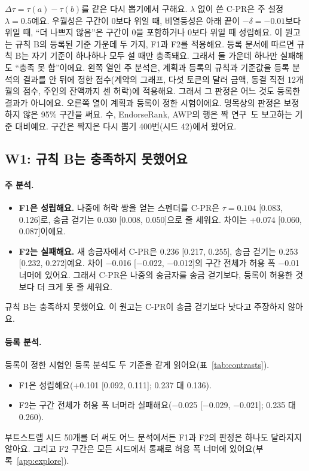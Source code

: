 \begin{table}[!p]
\vspace{4pt}
\parbox{\linewidth}{\footnotesize $\Delta\tau=\tau(a)-\tau(b)$를 같은 다시 뽑기에서 구해요. $\lambda$ 없이 쓴 C-PR은 주 설정 $\lambda=0.5$예요. 우월성은 구간이 0보다 위일 때, 비열등성은 아래 끝이 $-\delta=-0.01$보다 위일 때, “더 나쁘지 않음”은 구간이 0을 포함하거나 0보다 위일 때 성립해요. 이 원고는 규칙 B의 등록된 기준 가운데 두 가지, F1과 F2를 적용해요. 등록 문서에 따르면 규칙 B는 자기 기준이 하나하나 모두 설 때만 충족돼요. 그래서 둘 가운데 하나만 실패해도 “충족 못 함”이에요. 왼쪽 열인 주 분석은, 계획과 등록의 규칙과 기준값을 등록 분석의 결과를 안 뒤에 정한 점수(계약의 그래프, 다섯 토큰의 달러 금액, 동결 직전 12개월의 점수, 주인의 잔액까지 센 허락)에 적용해요. 그래서 그 판정은 어느 것도 등록한 결과가 아니에요. 오른쪽 열이 계획과 등록이 정한 시험이에요. 명목상의 판정은 보정하지 않은 95\% 구간을 써요. 수, EndorseRank, AWP의 행은 짝 연구~\cite{kwon2026companion}도 보고하는 기준 대비예요. 구간은 짝지은 다시 뽑기 400번(시드 42)에서 왔어요.}
\end{table}

\subsection{W1: 규칙 B는 충족하지 못했어요}

\paragraph{주 분석.}
\begin{itemize}
\item \textbf{F1은 성립해요.} 나중에 허락 쌍을 얻는 스펜더를 C-PR은 $\tau=0.104$ [0.083, 0.126]로, 송금 걷기는 0.030 [0.008, 0.050]으로 줄 세워요. 차이는 +0.074 [0.060, 0.087]이에요.
\item \textbf{F2는 실패해요.} 새 송금자에서 C-PR은 0.236 [0.217, 0.255], 송금 걷기는 0.253 [0.232, 0.272]예요. 차이 −0.016 [−0.022, −0.012]의 구간 전체가 허용 폭 −0.01 너머에 있어요. 그래서 C-PR은 나중의 송금자를 송금 걷기보다, 등록이 허용한 것보다 더 크게 못 줄 세워요.
\end{itemize}
규칙 B는 충족하지 못했어요. 이 원고는 C-PR이 송금 걷기보다 낫다고 주장하지 않아요.

\paragraph{등록 분석.}
등록이 정한 시험인 등록 분석도 두 기준을 같게 읽어요(표~\ref{tab:contrasts}).
\begin{itemize}
\item F1은 성립해요(+0.101 [0.092, 0.111]; 0.237 대 0.136).
\item F2는 구간 전체가 허용 폭 너머라 실패해요(−0.025 [−0.029, −0.021]; 0.235 대 0.260).
\end{itemize}
부트스트랩 시드 50개를 더 써도 어느 분석에서든 F1과 F2의 판정은 하나도 달라지지 않아요. 그리고 F2 구간은 모든 시드에서 통째로 허용 폭 너머에 있어요(부록~\ref{app:explore}).

